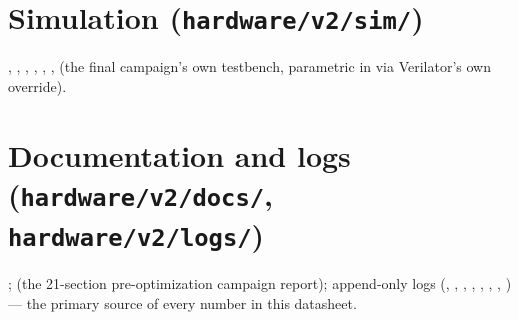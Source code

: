 \section{Simulation (\texttt{hardware/v2/sim/})}
, ,
, ,
, ,
 (the final campaign's own testbench,
parametric in  via Verilator's own  override).

\section{Documentation and logs (\texttt{hardware/v2/docs/}, \texttt{hardware/v2/logs/})}
;  (the
21-section pre-optimization campaign report); append-only logs
(, , , ,
, , , )
--- the primary source of every number in this datasheet.
